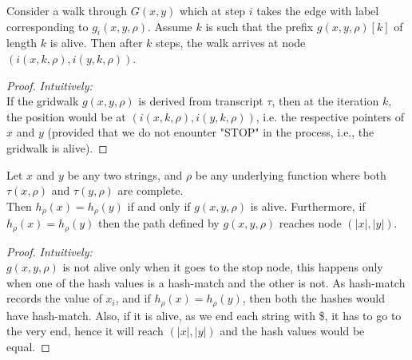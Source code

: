 \documentclass{article}
\begin{document}
\begin{lem}
    Consider a walk through $G(x,y)$ which at step $i$ takes the edge with label 
    corresponding to $g_i(x,y,\rho)$. Assume $k$ is such that the prefix 
    $g(x,y,\rho)[k]$ of length $k$ is alive. Then after $k$ steps, the walk 
    arrives at node $(i(x,k,\rho),i(y,k,\rho))$.
\end{lem}
\begin{proof}
    \textit{Intuitively:}\\
    If the gridwalk $g(x,y,\rho)$ is derived from transcript $\tau$, then at 
    the iteration $k$, the position would be at $(i(x,k,\rho),i(y,k,\rho))$, i.e.
    the respective pointers of $x$ and $y$ (provided that we do not enounter "STOP"
    in the process, i.e., the gridwalk is alive).
\end{proof}

\begin{lem}
    Let $x$ and $y$ be any two strings, and $\rho$ be any underlying function
    where both $\tau(x,\rho)$ and $\tau(y,\rho)$ are complete.\\
    Then $h_\rho(x)=h_\rho(y)$ if and only if $g(x,y,\rho)$ is alive. Furthermore,
    if $h_\rho(x)=h_\rho(y)$ then the path defined by $g(x,y,\rho)$ reaches
    node $(|x|,|y|)$.
\end{lem}
\begin{proof}
    \textit{Intuitively:}\\
    $g(x,y,\rho)$ is not alive only when it goes to the stop node, this happens
    only when one of the hash values is a hash-match and the other is not. As 
    hash-match records the value of $x_i$, and if $h_\rho(x)=h_\rho(y)$, then 
    both the hashes would have hash-match. 
    Also, if it is alive, as we end each string with \$, it has to go to the 
    very end, hence it will reach $(|x|,|y|)$ and the hash values would be equal.
\end{proof}
\end{document}
